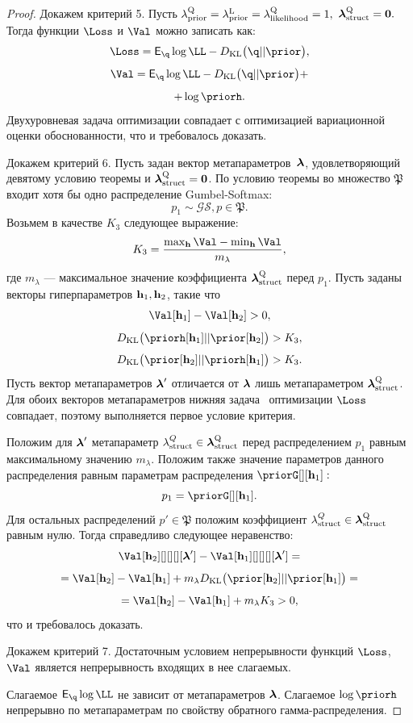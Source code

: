 \begin{proof}
Докажем критерий 5. Пусть $\lambda_\text{prior}^\text{Q} = \lambda_\text{prior}^\text{L} = \lambda_\text{likelihood}^\text{Q} = 1,$ $\boldsymbol{\lambda}_\text{struct}^\text{Q} = \mathbf{0}.$ Тогда функции $\Loss$ и $\Val$  можно записать как: 
$$\Loss = \E_{\q} \log \LL - \KL{\q}{\prior},$$
$$ \Val = \E_{\q} \log \LL - \KL{\q}{\prior}+$$
$$ + \log\priorh.$$
Двухуровневая задача оптимизации совпадает с оптимизацией вариационной оценки обоснованности, что и требовалось доказать.

Докажем критерий 6. 
Пусть задан вектор метапараметров~$\boldsymbol{\lambda}$, удовлетворяющий девятому условию теоремы и $\boldsymbol{\lambda}_\text{struct}^\text{Q} = \mathbf{0}$. 
По условию теоремы во множество $\mathfrak{P}$ входит хотя бы одно распределение Gumbel-Softmax:
\[
    p_1 \sim \mathcal{GS}, p \in \mathfrak{P}.
\]
Возьмем в качестве $K_3$ следующее выражение:
\[
K_3 = \frac{\max_{\h} \Val - \min_{\h }\Val}{m_{\lambda}},
\]
где $m_{\lambda}$ --- максимальное значение коэффициента $\boldsymbol{\lambda}_\text{struct}^\text{Q}$ перед $p_1$.
Пусть заданы векторы гиперпараметров $\mathbf{h}_1, \mathbf{h}_2$, такие что $$\Val[\h_1] - \Val[\h_2]>0,$$ $$\KL{\priorh[{\h_1}]}{\prior[{\h_2}]} > K_3,$$ $$\KL{\prior[{\h_2}]}{\priorh[{\h_1}]} > K_3.$$
Пусть вектор метапараметров $\boldsymbol{\lambda}'$ отличается от $\boldsymbol{\lambda}$ лишь метапараметром $\boldsymbol{\lambda}_\text{struct}^\text{Q}$. Для  обоих векторов метапараметров нижняя задача  оптимизации $\Loss$ совпадает, поэтому выполняется первое условие критерия.


Положим для $\boldsymbol{\lambda}'$ метапараметр $\lambda^{Q}_\text{struct} \in \boldsymbol{\lambda}_\text{struct}^\text{Q}$ перед распределением $p_1$  равным максимальному значению $m_{\lambda}$. Положим также значение параметров данного распределения равным параметрам распределения $\priorG[][\h_1]:$
\[
    p_1 = \priorG[][\h_1].
\]
Для остальных распределений $p' \in \mathfrak{P}$ положим коэффициент $\lambda^{Q}_\text{struct} \in \boldsymbol{\lambda}_\text{struct}^\text{Q}$ равным нулю.  
Тогда справедливо следующее неравенство:
\[
\Val[\h_2][][][][\lam'] - \Val[\h_1][][][][\lam'] = 
\]
\[
=\Val[\h_2]-\Val[\h_1] + m_{\lambda} \KL{\prior[\h_2]}{\prior[\h_1]} =
\]
\[
   = \Val[\h_2]-\Val[\h_1] + m_{\lambda} K_3 > 0,
\]
что и требовалось доказать.

Докажем критерий 7.
Достаточным условием непрерывности функций $\Loss$, $\Val$ является непрерывность входящих в нее слагаемых. 

Слагаемое $\E_{\q}\log\LL$ не зависит от метапараметров $\boldsymbol{\lambda}$. Слагаемое $\log\priorh$ непрерывно по метапараметрам по свойству обратного гамма-распределения.


\end{proof}
